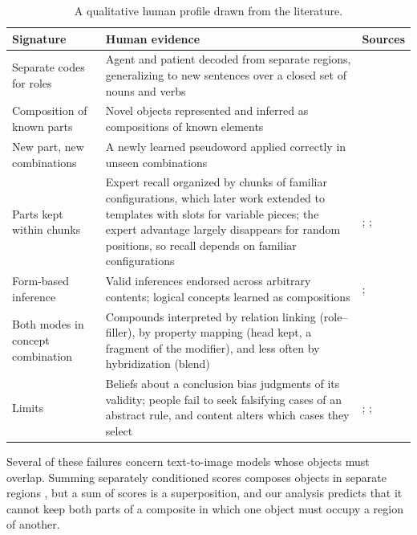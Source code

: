 \documentclass[10pt]{article}
\theoremstyle{plain}
\theoremstyle{remark}
\begin{document}
\begin{table}[h]
  \caption{A qualitative human profile drawn from the literature.}
  \label{tab:human}
  \centering\small
  \begin{tabularx}{\linewidth}{@{}P{3.3cm}YP{3.2cm}@{}}
    \toprule
    Signature & Human evidence & Sources \\
    \midrule
    Separate codes for roles & Agent and patient decoded from separate regions, generalizing to new sentences over a closed set of nouns and verbs & \citet{frankland2015} \\
    Composition of known parts & Novel objects represented and inferred as compositions of known elements & \citet{schwartenbeck2023} \\
    New part, new combinations & A newly learned pseudoword applied correctly in unseen combinations & \citet{lake2019} \\
    Parts kept within chunks & Expert recall organized by chunks of familiar configurations, which later work extended to templates with slots for variable pieces; the expert advantage largely disappears for random positions, so recall depends on familiar configurations & \citet{chase1973}; \citet{gobet1996templates}; \citet{gobet1996} \\
    Form-based inference & Valid inferences endorsed across arbitrary contents; logical concepts learned as compositions & \citet{rips1994}; \citet{piantadosi2016} \\
    Both modes in concept combination & Compounds interpreted by relation linking (role--filler), by property mapping (head kept, a fragment of the modifier), and less often by hybridization (blend) & \citet{wisniewski1997} \\
    Limits & Beliefs about a conclusion bias judgments of its validity; people fail to seek falsifying cases of an abstract rule, and content alters which cases they select & \citet{evans1983}; \citet{wason1968}; \citet{johnsonlaird1972,griggs1982,cheng1985} \\
    \bottomrule
  \end{tabularx}
\end{table}

\noindent
Several of these failures concern text-to-image models whose objects must overlap. Summing separately conditioned scores composes objects in separate regions \citep{liu2022composable}, but a sum of scores is a superposition, and our analysis predicts that it cannot keep both parts of a composite in which one object must occupy a region of another.
\end{document}
